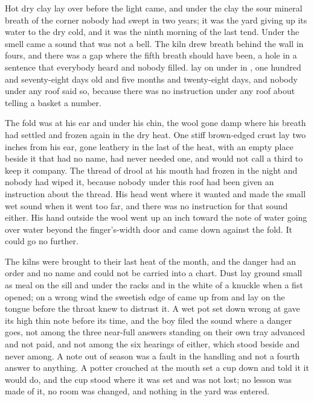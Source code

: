 
Hot dry clay lay over  before the light came, and under the clay the sour mineral breath of the corner nobody had swept in two years; it was the yard giving up its water to the dry cold, and it was the ninth morning of the last tend. Under the smell came a sound that was not a bell. The kiln drew breath behind the wall in fours, and there was a gap where the fifth breath should have been, a hole in a sentence that everybody heard and nobody filled.  lay on  under  in , one hundred and seventy-eight days old and five months and twenty-eight days, and nobody under any roof said so, because there was no instruction under any roof about telling a basket a number.

The fold was at his ear and under his chin, the wool gone damp where his breath had settled and frozen again in the dry heat. One stiff brown-edged crust lay two inches from his ear, gone leathery in the last of the heat, with an empty place beside it that had no name, had never needed one, and would not call a third to keep it company. The thread of drool at his mouth had frozen in the night and nobody had wiped it, because nobody under this roof had been given an instruction about the thread. His head went where it wanted and made the small wet sound when it went too far, and there was no instruction for that sound either. His hand outside the wool went up an inch toward the note of water going over water beyond the finger's-width door and came down against the fold. It could go no further.

The kilns were brought to their last heat of the month, and the danger had an order and no name and could not be carried into a chart. Dust lay ground small as meal on the sill and under the racks and in the white of a knuckle when a fist opened; on a wrong wind the sweetish edge of  came up from  and lay on the tongue before the throat knew to distrust it. A wet pot set down wrong at  gave its high thin note before its time, and the boy filed the sound where a danger goes, not among the three near-full answers standing on their own tray advanced and not paid, and not among the six hearings of  either, which stood beside and never among. A note out of season was a fault in the handling and not a fourth answer to anything. A potter crouched at the mouth set a cup down and told it it would do, and the cup stood where it was set and was not lost; no lesson was made of it, no room was changed, and nothing in the yard was entered.

